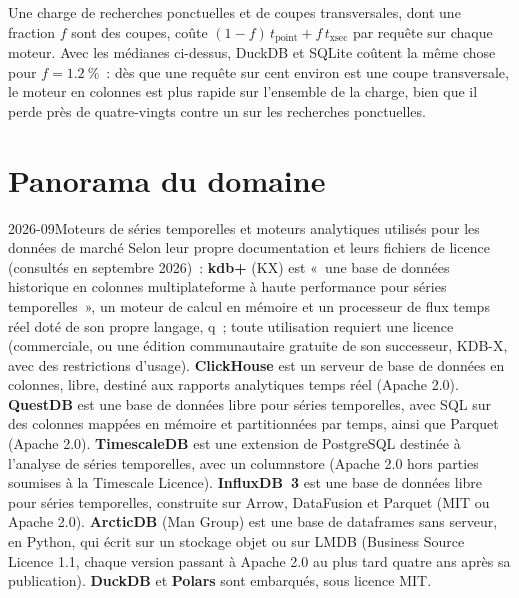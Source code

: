 \label{lst:pl:time-series-databases-and-the-alternatives:bench}

\begin{example}\label{ex:pl:time-series-databases-and-the-alternatives:mix}
Une charge de recherches ponctuelles et de coupes transversales, dont une fraction $f$ sont des coupes, coûte $(1-f)\,t_{\mathrm{point}} +
f\,t_{\mathrm{xsec}}$ par requête sur chaque moteur. Avec les médianes ci-dessus, DuckDB et SQLite coûtent la même chose pour $f = 1.2~\%$~: dès que
une requête sur cent environ est une coupe transversale, le moteur en colonnes est plus rapide sur l'ensemble de la charge, bien que
il perde près de quatre-vingts contre un sur les recherches ponctuelles.
\end{example}

\section{Panorama du domaine}

\begin{dated}{2026-09}{Moteurs de séries temporelles et moteurs analytiques utilisés pour les données de marché}\label{dat:pl:time-series-databases-and-the-alternatives:survey}
Selon leur propre documentation et leurs fichiers de licence (consultés en septembre 2026)~: \textbf{kdb+} (KX) est «~une base de données historique en colonnes
multiplateforme à haute performance pour séries temporelles~», un moteur de calcul en mémoire et un processeur de flux temps réel doté de son
propre langage, q~; toute utilisation requiert une licence (commerciale, ou une édition communautaire gratuite de son successeur, KDB-X, avec des
restrictions d'usage). \textbf{ClickHouse} est un serveur de base de données en colonnes, libre, destiné aux rapports analytiques temps réel (Apache
2.0). \textbf{QuestDB} est une base de données libre pour séries temporelles, avec SQL sur des colonnes mappées en mémoire et partitionnées par temps, ainsi que Parquet
(Apache 2.0). \textbf{TimescaleDB} est une extension de PostgreSQL destinée à l'analyse de séries temporelles, avec un columnstore (Apache 2.0 hors
parties soumises à la Timescale Licence). \textbf{InfluxDB~3} est une base de données libre pour séries temporelles, construite sur Arrow, DataFusion et
Parquet (MIT ou Apache 2.0). \textbf{ArcticDB} (Man Group) est une base de dataframes sans serveur, en Python, qui écrit sur un stockage objet
ou sur LMDB (Business Source Licence 1.1, chaque version passant à Apache 2.0 au plus tard quatre ans après sa publication). \textbf{DuckDB}
et \textbf{Polars} sont embarqués, sous licence MIT.
\end{dated}

